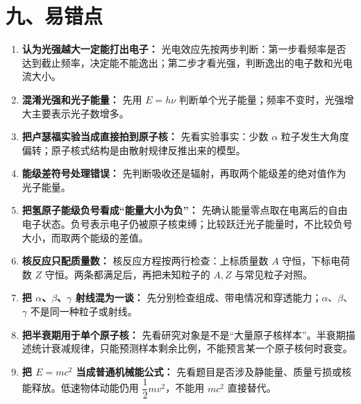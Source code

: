 \section*{九、易错点}
\begin{mistakebox}
\begin{enumerate}
  \item \textbf{认为光强越大一定能打出电子：} 光电效应先按两步判断：第一步看频率是否达到截止频率，决定能不能逸出；第二步才看光强，判断逸出的电子数和光电流大小。
  \item \textbf{混淆光强和光子能量：} 先用 $E=h\nu$ 判断单个光子能量；频率不变时，光强增大主要表示光子数增多。
  \item \textbf{把卢瑟福实验当成直接拍到原子核：} 先看实验事实：少数 $\alpha$ 粒子发生大角度偏转；原子核式结构是由散射规律反推出来的模型。
  \item \textbf{能级差符号处理错误：} 先判断吸收还是辐射，再取两个能级差的绝对值作为光子能量。
  \item \textbf{把氢原子能级负号看成“能量大小为负”：} 先确认能量零点取在电离后的自由电子状态。负号表示电子仍被原子核束缚；比较跃迁光子能量时，不比较负号大小，而取两个能级的差值。
  \item \textbf{核反应只配质量数：} 核反应方程按两行检查：上标质量数 $A$ 守恒，下标电荷数 $Z$ 守恒。两条都满足后，再把未知粒子的 $A,Z$ 与常见粒子对照。
  \item \textbf{把 $\alpha$、$\beta$、$\gamma$ 射线混为一谈：} 先分别检查组成、带电情况和穿透能力；$\alpha$、$\beta$、$\gamma$ 不是同一种粒子或射线。
  \item \textbf{把半衰期用于单个原子核：} 先看研究对象是不是“大量原子核样本”。半衰期描述统计衰减规律，只能预测样本剩余比例，不能预言某一个原子核何时衰变。
  \item \textbf{把 $E=mc^2$ 当成普通机械能公式：} 先看题目是否涉及静能量、质量亏损或核能释放。低速物体动能仍用 $\dfrac12mv^2$，不能用 $mc^2$ 直接替代。
\end{enumerate}
\end{mistakebox}

